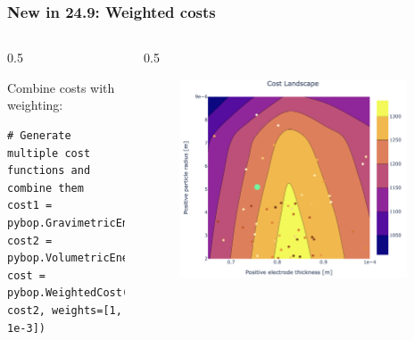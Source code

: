 \documentclass[aspectratio=169]{beamer}
\begin{document}
\begin{frame}[fragile,t]
\frametitle{New in 24.9: Weighted costs}
\vspace{-2em}
\begin{columns}
\begin{column}{0.5\textwidth}
\vspace{2em}
\begin{block}{Combine costs with weighting:}
\begin{lstlisting}[firstnumber=1, xleftmargin=10pt]
# Generate multiple cost functions and combine them
cost1 = pybop.GravimetricEnergyDensity(problem)
cost2 = pybop.VolumetricEnergyDensity(problem)
cost = pybop.WeightedCost(cost1, cost2, weights=[1, 1e-3])
\end{lstlisting}
\end{block}
\vspace{3.5em}
\end{column}
\begin{column}{0.5\textwidth}
    \begin{figure}
    \includegraphics[width=0.94\textwidth]{Images/Highlights/weighted-design-landscape.png}
    \end{figure}
\end{column}
\end{columns}
\end{frame}
\end{document}

